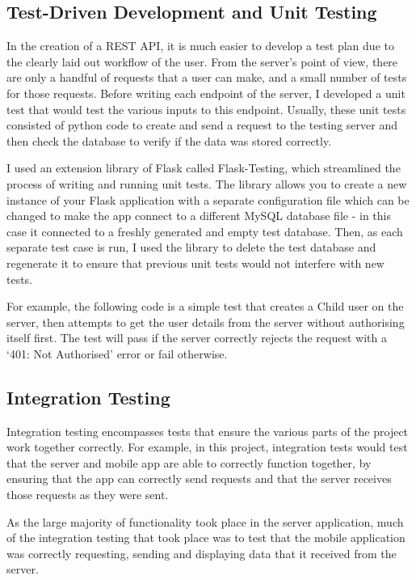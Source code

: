 \subsection{Test-Driven Development and Unit Testing}
In the creation of a REST API, it is much easier to develop a test plan due to the clearly laid out workflow of the user. 
From the server's point of view, there are only a handful of requests that a user can make, and a small number of tests for those requests. 
Before writing each endpoint of the server, I developed a unit test  that would test the various inputs to this endpoint.
Usually, these unit tests consisted of python code to create and send a request to the testing server and then check the database to verify if the data was stored correctly.

I used an extension library of Flask called Flask-Testing, which streamlined the process of writing and running unit tests.
The library allows you to create a new instance of your Flask application with a separate configuration file which can be changed to make the app connect to a different MySQL database file - in this case it connected to a freshly generated and empty test database.
Then, as each separate test case is run, I used the library to delete the test database and regenerate it to ensure that previous unit tests would not interfere with new tests.

For example, the following code is a simple test that creates a Child user on the server, then attempts to get the user details from the server without authorising itself first. 
The test will pass if the server correctly rejects the request with a `401: Not Authorised' error or fail otherwise.


\subsection{Integration Testing}
Integration testing encompasses tests that ensure the various parts of the project work together correctly.
For example, in this project, integration tests would test that the server and mobile app are able to correctly function together, by ensuring that the app can correctly send requests and that the server receives those requests as they were sent.

As the large majority of functionality took place in the server application, much of the integration testing that took place was to test that the mobile application was correctly requesting, sending and displaying data that it received from the server.

